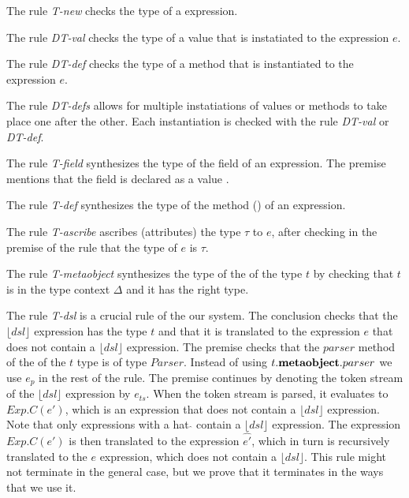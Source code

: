 The rule \textit{T-new} checks the type of a  expression. 

The rule \textit{DT-val} checks the type of a value that is instatiated to the expression $e$.

The rule \textit{DT-def} checks the type of a method  that is instantiated to the expression $e$.

The rule \textit{DT-defs} allows for multiple instatiations of values or methods to take place one after the other. Each instantiation is checked with the rule \textit{DT-val} or \textit{DT-def}.

The rule \textit{T-field} synthesizes the type of the field of an expression. The premise mentions that the field is declared as a value .

The rule \textit{T-def}  synthesizes the type of the method () of an expression. 

The rule \textit{T-ascribe} ascribes (attributes) the type $\tau$ to $e$, after checking in the premise of the rule that the type of $e$ is $\tau$.

The rule \textit{T-metaobject} synthesizes the type of the  of the type $t$ by checking that $t$ is in the type context $\Delta$ and it has the right type.

The rule \textit{T-dsl} is a crucial rule of the our system. The conclusion checks that the $\lfloor dsl \rfloor$ expression has the type $t$ and that it is translated to the expression $e$ that does not contain a $\lfloor dsl \rfloor$ expression. The premise checks that the $parser$ method of the  of the $t$ type is of type $Parser$. Instead of using $t.\textbf{metaobject}.parser$ we use $e_p$ in the rest of the rule. The premise continues by denoting the token stream of the $\lfloor dsl \rfloor$ expression by $e_{ts}$. When the token stream is parsed, it evaluates to $Exp.C(e')$, which is an expression that does not contain a $\lfloor dsl \rfloor$ expression. Note that only expressions with a hat $\hat{}$ contain a $\lfloor dsl \rfloor$ expression. The expression $Exp.C(e')$ is then translated to the expression $\hat{e'}$, which in turn is recursively translated to the $e$ expression, which does not contain a $\lfloor dsl \rfloor$. This rule might not terminate in the general case, but we prove that it terminates in the ways that we use it.















